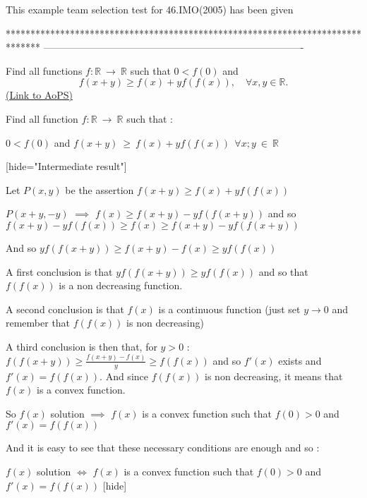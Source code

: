 \begin{solution}
	This example team selection test for 46.IMO(2005) has been given 
\end{solution}
*******************************************************************************
-------------------------------------------------------------------------------

\begin{problem}
	Find all functions $ f : \mathbb{R} \ \to \ \mathbb{R}$ such that $0< f(0)$ and \[ f(x+y) \geq f(x) + yf(f(x)) , \quad \forall x, y \in \mathbb{R}.\]
	\flushright \href{https://artofproblemsolving.com/community/c6h300639}{(Link to AoPS)}
\end{problem}



\begin{solution}
	\begin{tcolorbox}\begin{italicized}Find all function $ f : \mathbb{R} \ \to \ \mathbb{R}$  such that  :

   $ 0 < f(0)$ and $ f(x + y) \ \geq \ f(x) + yf(f(x)) \ \ \forall x; y \ \in \ \mathbb{R}$\end{italicized}\end{tcolorbox}
[hide="Intermediate result"]

Let $ P(x,y)$ be the assertion $ f(x+y)\geq f(x)+yf(f(x))$

$ P(x+y,-y)$ $ \implies$ $ f(x)\geq f(x+y)-yf(f(x+y))$ and so $ f(x+y)-yf(f(x))\geq f(x)\geq f(x+y)-yf(f(x+y))$

And so $ yf(f(x+y))\geq f(x+y)-f(x)\geq yf(f(x))$

A first conclusion is that $ yf(f(x+y))\geq yf(f(x))$ and so that $ f(f(x))$ is a non decreasing function.

A second conclusion is that $ f(x)$ is a continuous function (just set $ y\to 0$ and remember that $ f(f(x))$ is non decreasing)

A third conclusion is then that, for $ y>0$ : $ f(f(x+y))\geq \frac{f(x+y)-f(x)}y\geq f(f(x))$ and so $ f'(x)$ exists and $ f'(x)=f(f(x))$. And since $ f(f(x))$ is non decreasing, it means that $ f(x)$ is a convex function.

So $ f(x)$ solution $ \implies$ $ f(x)$ is a convex function such that $ f(0)>0$ and $ f'(x)=f(f(x))$

And it is easy to see that these necessary conditions are enough and so :

$ f(x)$ solution $ \iff$ $ f(x)$ is a convex function such that $ f(0)>0$ and $ f'(x)=f(f(x))$
[\/hide]
\end{solution}



